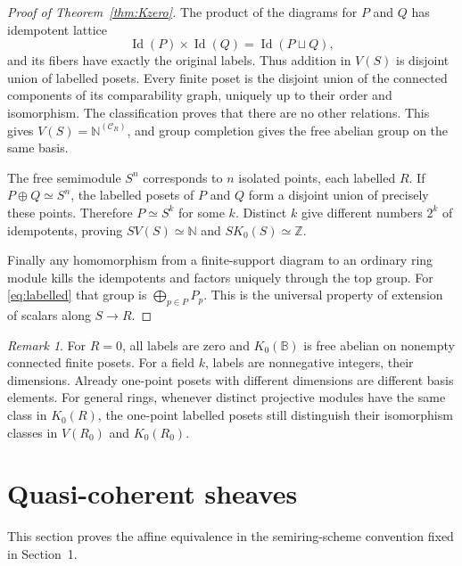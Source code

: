 \documentclass[11pt]{amsart}
\newcommand{\B}{\mathbb B}
\newcommand{\Z}{\mathbb Z}
\newcommand{\N}{\mathbb N}
\DeclareMathOperator{\Id}{Id}
\theoremstyle{definition}
\theoremstyle{remark}
\newtheorem{remark}[theorem]{Remark}
\begin{document}
\begin{proof}[Proof of Theorem~\ref{thm:Kzero}]
The product of the diagrams for $P$ and $Q$ has idempotent lattice
\[
 \Id(P)\times\Id(Q)=\Id(P\sqcup Q),
\]
and its fibers have exactly the original labels. Thus addition in $V(S)$ is disjoint union of labelled posets. Every finite poset is the disjoint union of the connected components of its comparability graph, uniquely up to their order and isomorphism. The classification proves that there are no other relations. This gives $V(S)=\N^{(\mathcal C_R)}$, and group completion gives the free abelian group on the same basis.

The free semimodule $S^n$ corresponds to $n$ isolated points, each labelled $R$. If $P\oplus Q\simeq S^n$, the labelled posets of $P$ and $Q$ form a disjoint union of precisely these points. Therefore $P\simeq S^k$ for some $k$. Distinct $k$ give different numbers $2^k$ of idempotents, proving $SV(S)\simeq\N$ and $SK_0(S)\simeq\Z$.

Finally any homomorphism from a finite-support diagram to an ordinary ring module kills the idempotents and factors uniquely through the top group. For \eqref{eq:labelled} that group is $\bigoplus_{p\in P}P_p$. This is the universal property of extension of scalars along $S\to R$.
\end{proof}

\begin{remark}
For $R=0$, all labels are zero and $K_0(\B)$ is free abelian on nonempty connected finite posets. For a field $k$, labels are nonnegative integers, their dimensions. Already one-point posets with different dimensions are different basis elements. For general rings, whenever distinct projective modules have the same class in $K_0(R)$, the one-point labelled posets still distinguish their isomorphism classes in $V(R_0)$ and $K_0(R_0)$.
\end{remark}



\section{Quasi-coherent sheaves}\label{sec:sheaves}
This section proves the affine equivalence in the semiring-scheme convention fixed in Section~1.
\end{document}
